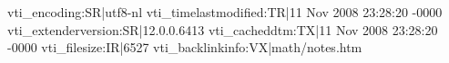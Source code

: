 vti_encoding:SR|utf8-nl
vti_timelastmodified:TR|11 Nov 2008 23:28:20 -0000
vti_extenderversion:SR|12.0.0.6413
vti_cacheddtm:TX|11 Nov 2008 23:28:20 -0000
vti_filesize:IR|6527
vti_backlinkinfo:VX|math/notes.htm

